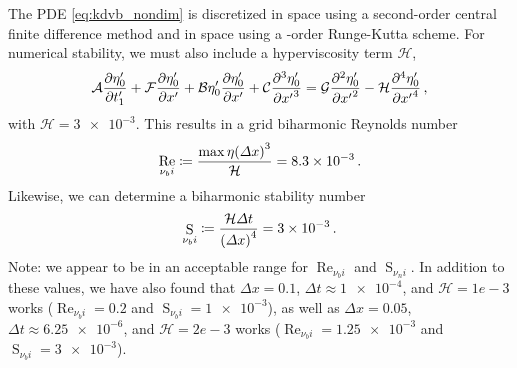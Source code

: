 \documentclass{jfm}
\DeclareMathOperator{\Reyn}{Re}
\DeclareMathOperator{\Stab}{S}
\begin{document}
The PDE \cref{eq:kdvb_nondim} is discretized in space using a
second-order central finite difference method and in space using a
-order Runge-Kutta scheme.
For numerical stability, we must also include a hyperviscosity term
$\mathcal{H}$,
\begin{equation}
  \mathcal{A} \pdv{\eta'_0}{t'_1} + \mathcal{F} \pdv{\eta'_0}{x'} + \mathcal{B}
  \eta'_0 \pdv{\eta'_0}{x'} + \mathcal{C} \pdv[3]{\eta'_0}{{x'}} =
  \mathcal{G} \pdv[2]{\eta'_0}{{x'}} - \mathcal{H}
  \pdv[4]{\eta'_0}{{x'}} \,,
\end{equation}
with $\mathcal{H} = \num{3e-3}$.
This results in a grid biharmonic Reynolds number
\begin{equation}
  \Reyn_{\nu_bi} \coloneqq \frac{\max{\eta} \pqty{\Delta
  x}^3}{\mathcal{H}} = \num{8.3e-3} \,.
\end{equation}
Likewise, we can determine a biharmonic stability number
\begin{equation}
  \Stab_{\nu_bi} \coloneqq \frac{\mathcal{H} \Delta t}{\pqty{\Delta
    x}^4} = \num{3e-3} \,.
\end{equation}
Note: we appear to be in an acceptable range for $\Reyn_{\nu_bi}$ and
$\Stab_{\nu_ni}$.
In addition to these values, we have also found that $\Delta x = 0.1$,
$\Delta t \approx \num{1e-4}$, and $\mathcal{H} = 1e-3$ works
($\Reyn_{\nu_bi} = 0.2$ and $\Stab_{\nu_bi} = \num{1e-3}$), as well as
$\Delta x = 0.05$, $\Delta t \approx \num{6.25e-6}$, and $\mathcal{H} =
2e-3$ works ($\Reyn_{\nu_bi} = \num{1.25e-3}$ and $\Stab_{\nu_bi} =
\num{3e-3}$).
\end{document}
